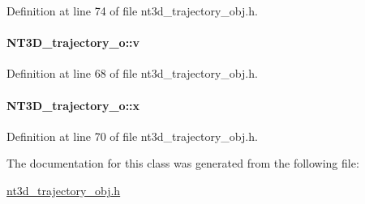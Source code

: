 Definition at line 74 of file nt3d\_\-trajectory\_\-obj.h.

\paragraph[{v}]{ {\bf NT3D\_\-trajectory\_\-o::v}}\hfill\label{class_n_t3_d__trajectory__o_a3d9165b8c2f508024d094add69c8e35f}


Definition at line 68 of file nt3d\_\-trajectory\_\-obj.h.

\paragraph[{x}]{ {\bf NT3D\_\-trajectory\_\-o::x}}\hfill\label{class_n_t3_d__trajectory__o_a84ace8462727e81be440218fddd9c256}


Definition at line 70 of file nt3d\_\-trajectory\_\-obj.h.



The documentation for this class was generated from the following file:\begin{DoxyCompactItemize}
\item 
\hyperlink{nt3d__trajectory__obj_8h}{nt3d\_\-trajectory\_\-obj.h}\end{DoxyCompactItemize}
